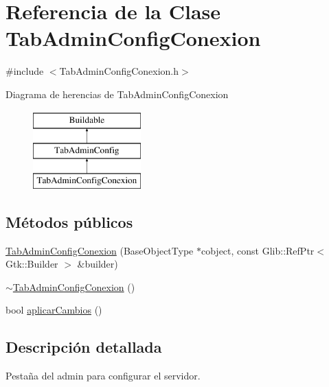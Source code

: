 \hypertarget{classTabAdminConfigConexion}{\section{\-Referencia de la \-Clase \-Tab\-Admin\-Config\-Conexion}
\label{classTabAdminConfigConexion}
}


{\ttfamily \#include $<$\-Tab\-Admin\-Config\-Conexion.\-h$>$}

\-Diagrama de herencias de \-Tab\-Admin\-Config\-Conexion\begin{figure}[H]
\begin{center}
\leavevmode
\includegraphics[height=3.000000cm]{classTabAdminConfigConexion}
\end{center}
\end{figure}
\subsection*{\-Métodos públicos}
\begin{DoxyCompactItemize}
\item 
\hyperlink{classTabAdminConfigConexion_a9484b4d34748ad37a110f031a3416ac5}{\-Tab\-Admin\-Config\-Conexion} (\-Base\-Object\-Type $\ast$cobject, const \-Glib\-::\-Ref\-Ptr$<$ \-Gtk\-::\-Builder $>$ \&builder)
\item 
\hyperlink{classTabAdminConfigConexion_a8fedfac8f43796c91cf2ade087dd165a}{$\sim$\-Tab\-Admin\-Config\-Conexion} ()
\item 
bool \hyperlink{classTabAdminConfigConexion_a06f690167044f079f24cb14daae272e1}{aplicar\-Cambios} ()
\end{DoxyCompactItemize}


\subsection{\-Descripción detallada}
\-Pestaña del admin para configurar el servidor. 

